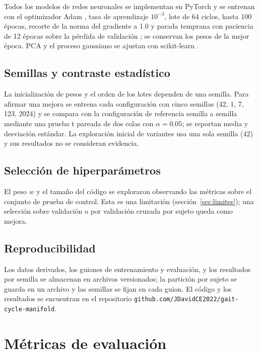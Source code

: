 \documentclass[11pt,a4paper]{article}
\begin{document}
Todos los modelos de redes neuronales se implementan en PyTorch \cite{paszke2019} y se entrenan con el optimizador Adam \cite{kingma2015}, tasa de aprendizaje $10^{-3}$, lote de 64 ciclos, hasta 100 épocas, recorte de la norma del gradiente a 1.0 \cite{pascanu2013} y parada temprana con paciencia de 12 épocas sobre la pérdida de validación \cite{prechelt1998}; se conservan los pesos de la mejor época. PCA y el proceso gaussiano se ajustan con scikit-learn \cite{pedregosa2011}.

\subsection{Semillas y contraste estadístico}

La inicialización de pesos y el orden de los lotes dependen de una semilla. Para afirmar una mejora se entrena cada configuración con cinco semillas (42, 1, 7, 123, 2024) y se compara con la configuración de referencia semilla a semilla mediante una prueba t pareada de dos colas \cite{student1908} con $\alpha=0.05$; se reportan media y desviación estándar. La exploración inicial de variantes usa una sola semilla (42) y sus resultados no se consideran evidencia.

\subsection{Selección de hiperparámetros}

El peso $w$ y el tamaño del código se exploraron observando las métricas sobre el conjunto de prueba de control. Esta es una limitación (sección~\ref{sec:limites}); una selección sobre validación o por validación cruzada por sujeto queda como mejora.

\subsection{Reproducibilidad}

Los datos derivados, los guiones de entrenamiento y evaluación, y los resultados por semilla se almacenan en archivos versionados; la partición por sujeto se guarda en un archivo y las semillas se fijan en cada guion. El código y los resultados se encuentran en el repositorio \texttt{github.com/JDavidCE2022/\allowbreak gait-cycle-manifold}.

\section{Métricas de evaluación}
\label{sec:metricas}
\end{document}
